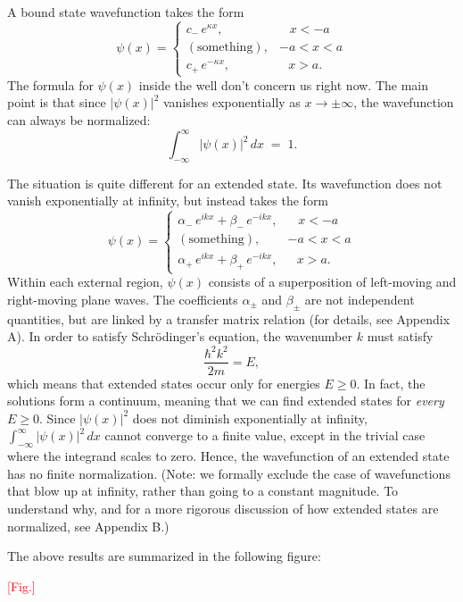 \documentclass[pra,12pt]{revtex4}
\begin{document}
A bound state wavefunction takes the form
$$\psi(x) = \begin{cases} c_-\, e^{\kappa x}, & \;\;\;x < -a\\ (\mathrm{something}) , & -a < x < a\\ c_+\, e^{-\kappa x} , & \;\;\,x > a.\end{cases}$$
The formula for $\psi(x)$ inside the well don't concern us right now.
The main point is that since $|\psi(x)|^2$ vanishes exponentially as
$x \rightarrow \pm \infty$, the wavefunction can always be
normalized:
$$\int_{-\infty}^\infty |\psi(x)|^2\, dx\; =\; 1.$$

The situation is quite different for an extended state.  Its
wavefunction does not vanish exponentially at infinity, but instead
takes the form
$$\psi(x) = \begin{cases} \alpha_-\, e^{ik x} + \beta_-\, e^{-ik x}, & \;\;\;x < -a\\ (\mathrm{something}) , & -a < x < a\\ \alpha_+\, e^{ik x} + \beta_+\, e^{-ik x} , & \;\;\,x > a.\end{cases}$$
Within each external region, $\psi(x)$ consists of a superposition of
left-moving and right-moving plane waves.  The coefficients
$\alpha_\pm$ and $\beta_\pm$ are not independent quantities, but are
linked by a transfer matrix relation (for details, see Appendix A).
In order to satisfy Schr\"odinger's equation, the wavenumber $k$ must
satisfy
$$\frac{\hbar^2k^2}{2m} = E,$$
which means that extended states occur only for energies $E \ge 0$.
In fact, the solutions form a continuum, meaning that we can find
extended states for \textit{every} $E \ge 0$.  Since $|\psi(x)|^2$
does not diminish exponentially at infinity, $\int_{-\infty}^\infty
|\psi(x)|^2\, dx$ cannot converge to a finite value, except in the
trivial case where the integrand scales to zero.  Hence, the
wavefunction of an extended state has no finite normalization.  (Note:
we formally exclude the case of wavefunctions that blow up at
infinity, rather than going to a constant magnitude.  To understand
why, and for a more rigorous discussion of how extended states are
normalized, see Appendix B.)

The above results are summarized in the following figure:

\textcolor{red}{[Fig.]}

\end{document}
